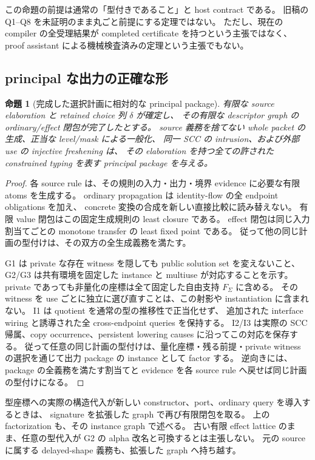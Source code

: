 \documentclass[11pt,a4paper]{article}
\newtheorem{theorem}{命題}[section]
\theoremstyle{remark}
\begin{document}
この命題の前提は通常の「型付きであること」と host contract である。
旧稿の Q1--Q8 を未証明のまま丸ごと前提にする定理ではない。
ただし、現在の compiler の全受理結果が completed certificate を持つという主張ではなく、
proof assistant による機械検査済みの定理という主張でもない。

\subsection{principal な出力の正確な形}

\begin{theorem}[完成した選択計画に相対的な principal package]
有限な source elaboration と retained choice 列 \(\delta\) が確定し、
その有限な descriptor graph の ordinary/effect 閉包が完了したとする。
source 義務を捨てない whole packet の生成、正当な level/mask による一般化、
同一 SCC の intrusion、および外部 use の injective freshening は、
その elaboration を持つ全ての許された constrained typing を表す principal package を与える。
\end{theorem}

\begin{proof}
各 source rule は、その規則の入力・出力・境界 evidence に必要な有限 atoms を生成する。
ordinary propagation は identity-flow の全 endpoint obligations を加え、
concrete 変換の合成を新しい直接比較に読み替えない。
有限 value 閉包はこの固定生成規則の least closure である。
effect 閉包は同じ入力割当てごとの monotone transfer の least fixed point である。
従って他の同じ計画の型付けは、その双方の全生成義務を満たす。

G1 は private な存在 witness を隠しても public solution set を変えないこと、
G2/G3 は共有環境を固定した instance と multiuse が対応することを示す。
private であっても非量化の座標は全て固定した自由支持 \(F_\Sigma\) に含める。
その witness を use ごとに独立に選び直すことは、この射影や instantiation に含まれない。
I1 は quotient を通常の型の推移性で正当化せず、
追加された interface wiring と誘導された全 cross-endpoint queries を保持する。
I2/I3 は実際の SCC 帰属、copy occurrence、persistent lowering causes に沿ってこの対応を保存する。
従って任意の同じ計画の型付けは、量化座標・残る前提・private witness の選択を通じて出力 package の instance として factor する。
逆向きには、package の全義務を満たす割当てと evidence を各 source rule へ戻せば同じ計画の型付けになる。
\end{proof}

型座標への実際の構造代入が新しい constructor、port、ordinary query を導入するときは、
signature を拡張した graph で再び有限閉包を取る。
上の factorization も、その instance graph で述べる。
古い有限 effect lattice のまま、任意の型代入が G2 の alpha 改名と可換するとは主張しない。
元の source に属する delayed-shape 義務も、拡張した graph へ持ち越す。
\end{document}
